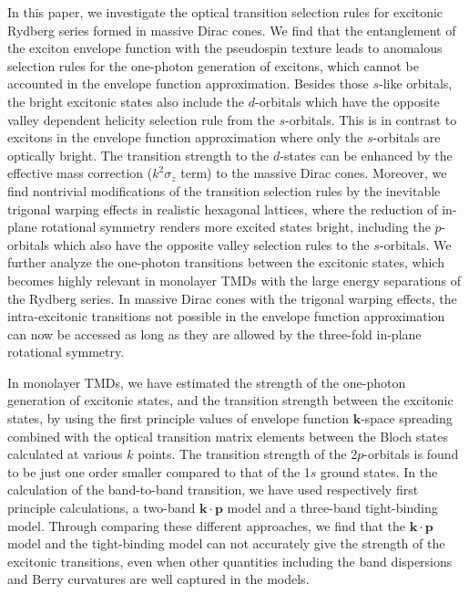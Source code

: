 \documentclass[prb,twocolumn,amsmath,amssymb,superscriptaddress,showpacs]{revtex4}
\begin{document}
In this paper, we investigate the optical transition selection rules for excitonic Rydberg series formed in massive Dirac cones. We find that the entanglement of the exciton envelope function with the pseudospin texture leads to anomalous selection rules for the one-photon generation of excitons, which cannot be accounted in the envelope function approximation. Besides those $s$-like orbitals, the bright excitonic states also include the $d$-orbitals which have the opposite valley dependent helicity selection rule from the $s$-orbitals. This is in contrast to excitons in the envelope function approximation where only the $s$-orbitals are optically bright. The transition strength to the $d$-states can be enhanced by the effective mass correction ($k^2 \sigma_z$ term) to the massive Dirac cones. Moreover, we find nontrivial modifications of the transition selection rules by the inevitable trigonal warping effects in realistic hexagonal lattices, where the reduction of in-plane rotational symmetry renders more excited states bright, including the $p$-orbitals which also have the opposite valley selection rules to the $s$-orbitals. We further analyze the one-photon transitions between the excitonic states, which becomes highly relevant in monolayer TMDs with the large energy separations of the Rydberg series. In massive Dirac cones with the trigonal warping effects, the intra-excitonic transitions not possible in the envelope function approximation can now be accessed as long as they are allowed by the three-fold in-plane rotational symmetry.

In monolayer TMDs, we have estimated the strength of the one-photon generation of excitonic states, and the transition strength between the excitonic states, by using the first principle values of envelope function $\mathbf k$-space spreading combined with the optical transition matrix elements between the Bloch states calculated at various $k$ points. The transition strength of the 2$p$-orbitals is found to be just one order smaller compared to that of the 1$s$ ground states. In the calculation of the band-to-band transition, we have used respectively first principle calculations, a two-band $\mathbf k\cdot\mathbf p$ model and a three-band tight-binding model. Through comparing these different approaches, we find that the $\mathbf k\cdot\mathbf p$ model and the tight-binding model can not accurately give the strength of the excitonic transitions, even when other quantities including the band dispersions and Berry curvatures are well captured in the models.
\end{document}

